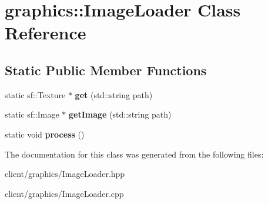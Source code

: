 \hypertarget{classgraphics_1_1_image_loader}{\section{graphics\-:\-:Image\-Loader Class Reference}
\label{classgraphics_1_1_image_loader}
}
\subsection*{Static Public Member Functions}
\begin{DoxyCompactItemize}
\item 
\hypertarget{classgraphics_1_1_image_loader_acc1dfadaa2cd284461fb55a332f2e4bf}{static sf\-::\-Texture $\ast$ {\bfseries get} (std\-::string path)}\label{classgraphics_1_1_image_loader_acc1dfadaa2cd284461fb55a332f2e4bf}

\item 
\hypertarget{classgraphics_1_1_image_loader_a180576db0e26030d7fa2ebee1a22d406}{static sf\-::\-Image $\ast$ {\bfseries get\-Image} (std\-::string path)}\label{classgraphics_1_1_image_loader_a180576db0e26030d7fa2ebee1a22d406}

\item 
\hypertarget{classgraphics_1_1_image_loader_a3433aa6c937382c7c47c500bb5924c85}{static void {\bfseries process} ()}\label{classgraphics_1_1_image_loader_a3433aa6c937382c7c47c500bb5924c85}

\end{DoxyCompactItemize}


The documentation for this class was generated from the following files\-:\begin{DoxyCompactItemize}
\item 
client/graphics/Image\-Loader.\-hpp\item 
client/graphics/Image\-Loader.\-cpp\end{DoxyCompactItemize}
